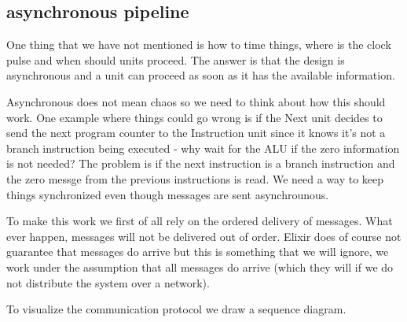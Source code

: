 \documentclass[a4paper,11pt]{article}
\begin{document}
\subsection{asynchronous pipeline}

One thing that we have not mentioned is how to time things, where is
the clock pulse and when should units proceed. The answer is that the
design is asynchronous and a unit can proceed as soon as it has the
available information.

Asynchronous does not mean chaos so we need to think about how this
should work. One example where things could go wrong is if the Next
unit decides to send the next program counter to the Instruction unit
since it knows it's not a branch instruction being executed - why wait
for the ALU if the zero information is not needed? The problem is if
the next instruction is a branch instruction and the zero messge from
the previous instructions is read. We need a way to keep things
synchronized even though messages are sent asynchrounous. 

To make this work we first of all rely on the ordered delivery of
messages. What ever happen, messages will not be delivered out of
order. Elixir does of course not guarantee that messages do arrive but
this is something that we will ignore, we work under the assumption
that all messages do arrive (which they will if we do not distribute
the system over a network).

To visualize the communication protocol we draw a sequence diagram.
\end{document}
